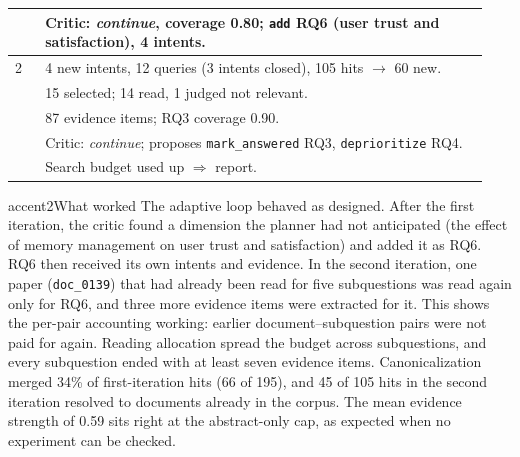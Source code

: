 \documentclass{article}
\newcommand{\code}[1]{\texttt{#1}}
\begin{document}
\begin{table}[t]
\begin{minipage}[t]{0.53\linewidth}
\begin{tabular}{@{}p{0.06\linewidth}p{0.88\linewidth}@{}}
  & Critic: \emph{continue}, coverage 0.80; \code{add} RQ6 (user trust and satisfaction), 4 intents. \\
\midrule
2 & 4 new intents, 12 queries (3 intents closed), 105 hits $\to$ 60 new. \\
  & 15 selected; 14 read, 1 judged not relevant. \\
  & 87 evidence items; RQ3 coverage 0.90. \\
  & Critic: \emph{continue}; proposes \code{mark\_answered} RQ3, \code{deprioritize} RQ4. \\
  & Search budget used up $\Rightarrow$ report. \\
\bottomrule
\end{tabular}
\end{minipage}
\end{table}

\begin{callout}{accent2}{What worked}
The adaptive loop behaved as designed. After the
first iteration, the critic found a dimension the planner had not
anticipated (the effect of memory management on user trust and
satisfaction) and added it as RQ6. RQ6 then received its own intents and
evidence. In the second iteration, one paper (\code{doc\_0139}) that had
already been read for five subquestions was read again only for RQ6, and
three more evidence items were extracted for it. This shows the per-pair
accounting working: earlier document--subquestion pairs were not paid for
again. Reading allocation spread the budget across subquestions, and every
subquestion ended with at least seven evidence items. Canonicalization
merged 34\% of first-iteration hits (66 of 195), and 45 of 105 hits in the
second iteration resolved to documents already in the corpus. The mean
evidence strength of 0.59 sits right at the abstract-only cap, as expected
when no experiment can be checked.
\end{callout}
\end{document}
